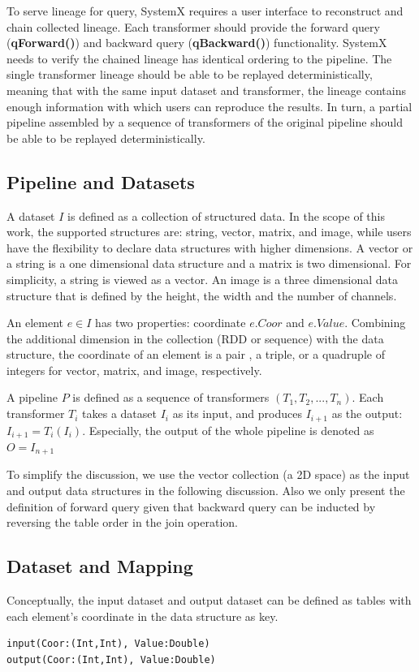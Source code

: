 \documentclass{sig-alternate}
\begin{document}
To serve lineage for query, SystemX requires a user interface to reconstruct and chain collected lineage.
Each transformer should provide the forward query ({\bf qForward()}) and backward query ({\bf qBackward()}) functionality.
SystemX needs to verify the chained lineage has identical ordering to the pipeline.
The single transformer lineage should be able to be replayed deterministically, meaning that with the same input dataset and transformer,
the lineage contains enough information with which users can reproduce the results.
In turn, a partial pipeline assembled by a sequence of transformers of the original pipeline should be able to be replayed deterministically.

\subsection{Pipeline and Datasets}
\label{sec:Map-Pipe-Data}
A dataset $I$ is defined as a collection of structured data. In the scope of this work, the supported structures are: 
string, vector, matrix, and image, while users have the flexibility to declare data structures with higher dimensions.
A vector or a string is a one dimensional data structure and a matrix is two dimensional. 
For simplicity, a string is viewed as a vector.
An image is a three dimensional data structure that is defined by the height, the width and the number
of channels. 

An element $e \in I$ has two properties: coordinate $e.Coor$ and $e.Value$. 
Combining the additional dimension in the collection (RDD or sequence) with the data structure, 
the coordinate of an element is a pair , a triple, or a quadruple of integers
for vector, matrix, and image, respectively.

A pipeline $P$ is defined as a sequence of transformers $(T_1, T_2, ..., T_n)$. 
Each transformer $T_i$ takes a dataset $I_i$ as its input, and produces $I_{i+1}$ as the output: 
$I_{i+1} = T_i(I_i)$. 
Especially, the output of the whole pipeline is denoted as $O = I_{n+1}$

To simplify the discussion, we use the vector collection (a 2D space) as the input and output data structures in the following discussion.
Also we only present the definition of forward query given that 
backward query can be inducted by reversing the table order in the join operation.

\subsection{Dataset and Mapping}
\label{sec:formal-ds-mapping}
Conceptually, the input dataset and output dataset can be defined
as tables with each element's coordinate in the data structure as key.
\begin{lstlisting}
input(Coor:(Int,Int), Value:Double)
output(Coor:(Int,Int), Value:Double)
\end{lstlisting}
\end{document}
